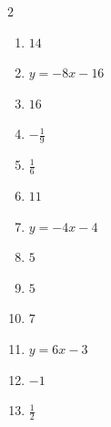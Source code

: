 \documentclass[11pt]{article}
\begin{document}
\begin{keybox}
\begin{multicols}{2}
\small
\begin{enumerate}[leftmargin=*,itemsep=3pt]
  \item $14$
  \item $y=-8x-16$
  \item $16$
  \item $-\tfrac19$
  \item $\tfrac16$
  \item $11$
  \item $y=-4x-4$
  \item $5$
  \item $5$
  \item $7$
  \item $y=6x-3$
  \item $-1$
  \item $\tfrac12$
\end{enumerate}
\end{multicols}
\end{keybox}
\end{document}
